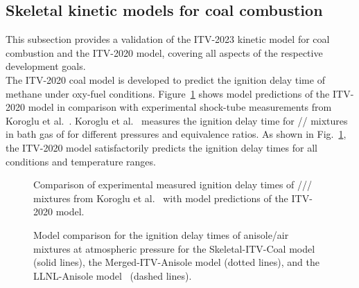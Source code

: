 \begin{refsection}
\subsection{Skeletal kinetic models for coal combustion}
This subsection provides a validation of the ITV-2023 kinetic model for coal combustion and the ITV-2020 model, covering all aspects of the respective development goals.
\\
The ITV-2020 coal model is developed to predict the ignition delay time of methane under oxy-fuel conditions. Figure~\ref{fig:B1bIDTLimingCaiCoalMechanism} shows model predictions of the ITV-2020 model in comparison with experimental shock-tube measurements from Koroglu et al.~\cite{Koroglu2016}. Koroglu et al.~\cite{Koroglu2016} measures the ignition delay time for // mixtures in bath gas of  for different pressures and equivalence ratios. As shown in Fig.~\ref{fig:B1bIDTLimingCaiCoalMechanism}, the ITV-2020 model satisfactorily predicts the ignition delay times for all conditions and temperature ranges.
\begin{figure}[h]
  \centering
  \hfill
  \hfill
  \caption{Comparison of experimental measured ignition delay times of /// mixtures from Koroglu et al.~\cite{Koroglu2016} with model predictions of the ITV-2020 model.}
  \label{fig:B1bIDTLimingCaiCoalMechanism}
\end{figure}
\begin{figure}[t]
  \centering
  \hfill
  \hfill
  \caption{Model comparison for the ignition delay times of anisole/air mixtures at atmospheric pressure for the Skeletal-ITV-Coal model (solid lines), the Merged-ITV-Anisole model (dotted lines), and the LLNL-Anisole model~\cite{Wagnon2018} (dashed lines).}
  \label{fig:B1bIDTAnisoleCoalMechanism}
\end{figure}
\\

\end{refsection}
